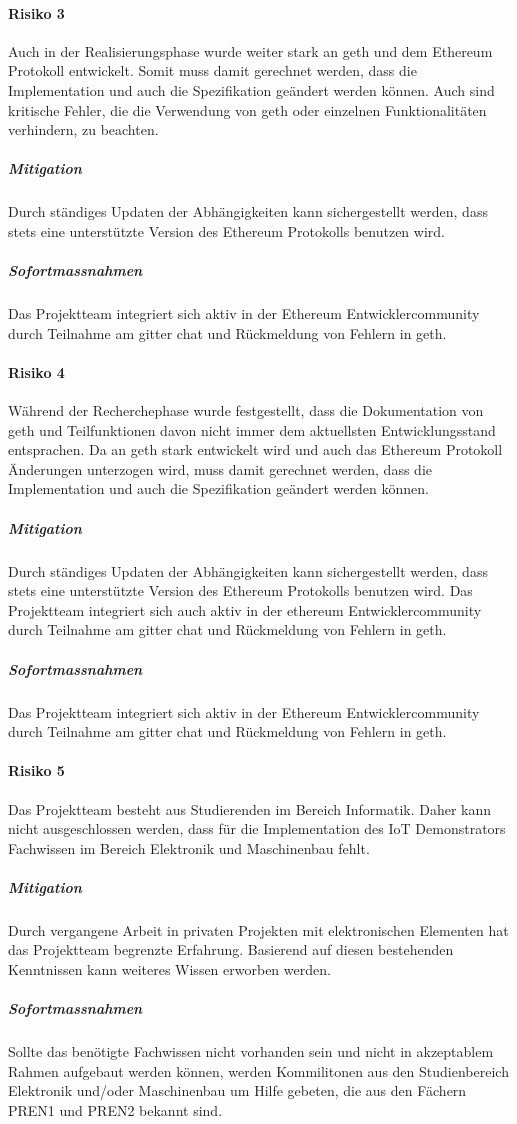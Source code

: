 \paragraph{Risiko 3}
Auch in der Realisierungsphase wurde weiter stark an geth und dem Ethereum Protokoll entwickelt. Somit muss damit gerechnet werden, dass die Implementation und auch die Spezifikation geändert werden können. Auch sind kritische Fehler, die die Verwendung von geth oder einzelnen Funktionalitäten verhindern, zu beachten.\cite[EIPs]{github.com/ethereum}
\subparagraph{Mitigation}
Durch ständiges Updaten der Abhängigkeiten kann sichergestellt werden, dass stets eine unterstützte Version des Ethereum Protokolls benutzen wird.
\subparagraph{Sofortmassnahmen}
Das Projektteam integriert sich aktiv in der Ethereum Entwicklercommunity durch Teilnahme am gitter chat und Rückmeldung von Fehlern in geth.

\paragraph{Risiko 4}
Während der Recherchephase wurde festgestellt, dass die Dokumentation von geth und Teilfunktionen davon nicht immer dem aktuellsten Entwicklungsstand entsprachen. Da an geth stark entwickelt wird und auch das Ethereum Protokoll Änderungen unterzogen wird, muss damit gerechnet werden, dass die Implementation und auch die Spezifikation geändert werden können.
\subparagraph{Mitigation}
Durch ständiges Updaten der Abhängigkeiten kann sichergestellt werden, dass stets eine unterstützte Version des Ethereum Protokolls benutzen wird. Das Projektteam integriert sich auch aktiv in der ethereum Entwicklercommunity durch Teilnahme am gitter chat und Rückmeldung von Fehlern in geth.
\subparagraph{Sofortmassnahmen}
Das Projektteam integriert sich aktiv in der Ethereum Entwicklercommunity durch Teilnahme am gitter chat und Rückmeldung von Fehlern in geth.

\paragraph{Risiko 5}
Das Projektteam besteht aus Studierenden im Bereich Informatik. Daher kann nicht ausgeschlossen werden, dass für die Implementation des IoT Demonstrators Fachwissen im Bereich Elektronik und Maschinenbau fehlt.
\subparagraph{Mitigation}
Durch vergangene Arbeit in privaten Projekten mit elektronischen Elementen hat das Projektteam begrenzte Erfahrung. Basierend auf diesen bestehenden Kenntnissen kann weiteres Wissen erworben werden.
\subparagraph{Sofortmassnahmen}
Sollte das benötigte Fachwissen nicht vorhanden sein und nicht in akzeptablem Rahmen aufgebaut werden können, werden Kommilitonen aus den Studienbereich Elektronik und/oder Maschinenbau um Hilfe gebeten, die aus den Fächern PREN1 und PREN2 bekannt sind.


